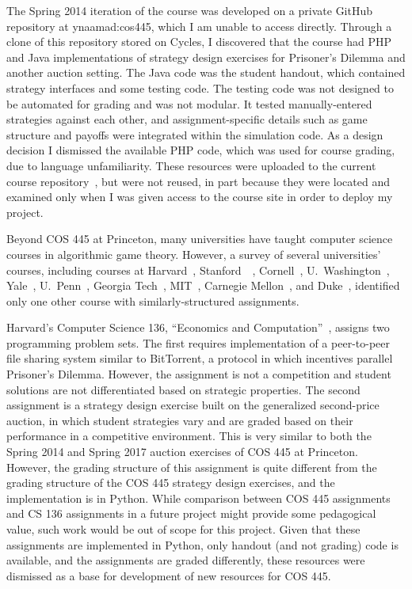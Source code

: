 \documentclass[pageno]{jpaper}
\begin{document}
The Spring 2014 iteration of the course was developed on a private GitHub repository at ynaamad:cos445, which I am unable to access directly.
Through a clone of this repository stored on Cycles, I discovered that the course had PHP and Java implementations of strategy design exercises for Prisoner's Dilemma and another auction setting.
The Java code was the student handout, which contained strategy interfaces and some testing code.
The testing code was not designed to be automated for grading and was not modular.
It tested manually-entered strategies against each other, and assignment-specific details such as game structure and payoffs were integrated within the simulation code.
As a design decision I dismissed the available PHP code, which was used for course grading, due to language unfamiliarity.
These resources were uploaded to the current course repository~\cite{s14}, but were not reused, in part because they were located and examined only when I was given access to the course site in order to deploy my project.

Beyond COS 445 at Princeton, many universities have taught computer science courses in algorithmic game theory.
However, a survey of several universities' courses, including courses at Harvard~\cite{harvard}, Stanford~\cite{stanford364a}~\cite{stanfordf16}, Cornell~\cite{cornell}, U.\ Washington~\cite{uw}, Yale~\cite{yale}, U.\ Penn~\cite{penn}, Georgia Tech~\cite{gtech}, MIT~\cite{mit}, Carnegie Mellon~\cite{cmu}, and Duke~\cite{duke}, identified only one other course with similarly-structured assignments.

Harvard's Computer Science 136, ``Economics and Computation''~\cite{harvard}, assigns two programming problem sets.
The first requires implementation of a peer-to-peer file sharing system similar to BitTorrent, a protocol in which incentives parallel Prisoner's Dilemma.
However, the assignment is not a competition and student solutions are not differentiated based on strategic properties.
The second assignment is a strategy design exercise built on the generalized second-price auction, in which student strategies vary and are graded based on their performance in a competitive environment.
This is very similar to both the Spring 2014 and Spring 2017 auction exercises of COS 445 at Princeton.
However, the grading structure of this assignment is quite different from the grading structure of the COS 445 strategy design exercises, and the implementation is in Python.
While comparison between COS 445 assignments and CS 136 assignments in a future project might provide some pedagogical value, such work would be out of scope for this project.
Given that these assignments are implemented in Python, only handout (and not grading) code is available, and the assignments are graded differently, these resources were dismissed as a base for development of new resources for COS 445.
\end{document}

